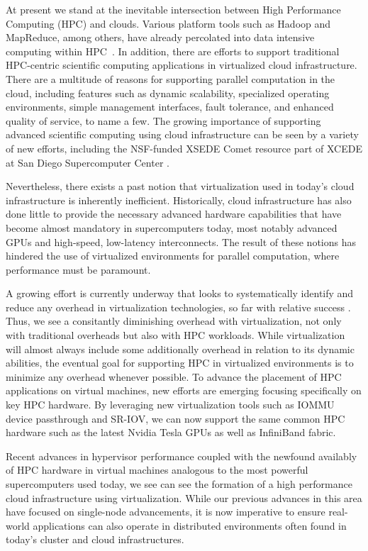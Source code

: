 \documentclass{sigplanconf}
\begin{document}
At present we stand at the inevitable intersection between High Performance Computing (HPC) and clouds. Various platform tools such as Hadoop and MapReduce, among others, have already percolated into data intensive computing within HPC~\cite{jha2014apache}.  In addition, there are efforts to support traditional HPC-centric scientific computing applications in virtualized cloud infrastructure.  There are a multitude of reasons for supporting parallel computation in the cloud\cite{Armbrust2010}, including features such as dynamic scalability, specialized operating environments, simple management interfaces, fault tolerance, and enhanced quality of service, to name a few. The growing importance of supporting advanced scientific computing using cloud infrastructure can be seen by a variety of new efforts, including the NSF-funded XSEDE Comet resource part of XCEDE at San Diego Supercomputer Center \cite{moore2014gateways}.  

Nevertheless, there exists a past notion that virtualization used in today's cloud infrastructure is inherently inefficient.  Historically, cloud infrastructure has also done little to provide the necessary advanced hardware capabilities that have become almost mandatory in supercomputers today, most notably advanced GPUs and high-speed, low-latency interconnects.  The result of these notions has hindered the use of virtualized environments for parallel computation, where performance must be paramount.

A growing effort is currently underway that looks to systematically identify and reduce any overhead in virtualization technologies, so far with relative success \cite{Younge2011cloud, Luszczek:2011:EHC}.  Thus, we see a consitantly diminishing overhead with virtualization, not only with traditional overheads \cite{huber2011evaluating} but also with HPC workloads.  While virtualization will almost always include some additionally overhead in relation to its dynamic abilities, the eventual goal for supporting HPC in virtualized environments  is to minimize any overhead whenever possible.  To advance the placement of HPC applications on virtual machines, new efforts are emerging focusing specifically on key HPC hardware. By leveraging new virtualization tools such as IOMMU device passthrough and SR-IOV, we can now support the same common HPC hardware such as the latest Nvidia Tesla GPUs \cite{Walters2014cloud}  as well as InfiniBand fabric\cite{jose2013sr}.  

Recent advances in hypervisor performance coupled with the newfound availably of HPC hardware in virtual machines analogous to the most powerful supercomputers used today, we see can see the formation of a high performance cloud infrastructure using virtualization. While our previous advances in this area have focused on single-node advancements, it is now imperative to ensure real-world applications can also operate in distributed environments often found in today's cluster and cloud infrastructures. 
\end{document}
